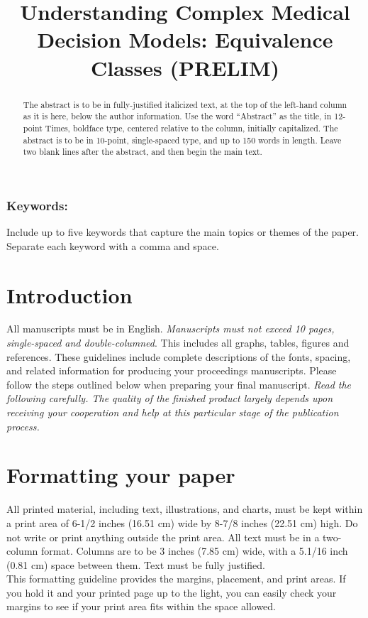 \documentclass[10pt]{article}
\title{Understanding Complex Medical Decision Models: Equivalence Classes (PRELIM)}
\date{}
\begin{document}
\maketitle
\begin{abstract}
The abstract is to be in fully-justified italicized text, at the top of the left-hand column as it is here, below the author information. Use the word “Abstract” as the title, in 12-point Times, boldface type, centered relative to the column, initially capitalized. The abstract is to be in 10-point, single-spaced type, and up to 150 words in length. Leave two blank lines after the abstract, and then begin the main text. 
\end{abstract}

\subsubsection*{Keywords:}

Include up to five keywords that capture the main topics or themes of the paper. Separate each keyword with a comma and space.

\section{Introduction}

All manuscripts must be in English. {\em Manuscripts must not exceed 10 pages, single-spaced and double-columned}.  This includes all graphs, tables, figures and references. These guidelines include complete descriptions of the fonts, spacing, and related information for producing your proceedings manuscripts. Please follow the steps outlined below when preparing your final manuscript. {\em Read the following carefully. The quality of the finished product largely depends upon receiving your cooperation and help at this particular stage of the publication process.}


\section{Formatting your paper}

All printed material, including text, illustrations, and charts, must be kept within a print area of 6-1/2 inches (16.51 cm) wide by 8-7/8 inches (22.51 cm) high. Do not write or print anything outside the print area. All text must be in a two-column format. Columns are to be 3 inches (7.85 cm) wide, with a 5.1/16 inch (0.81 cm) space between them. Text must be fully justified. \\
This formatting guideline provides the margins, placement, and print areas. If you hold it and your printed page up to the light, you can easily check your margins to see if your print area fits within the space allowed.
\end{document}
